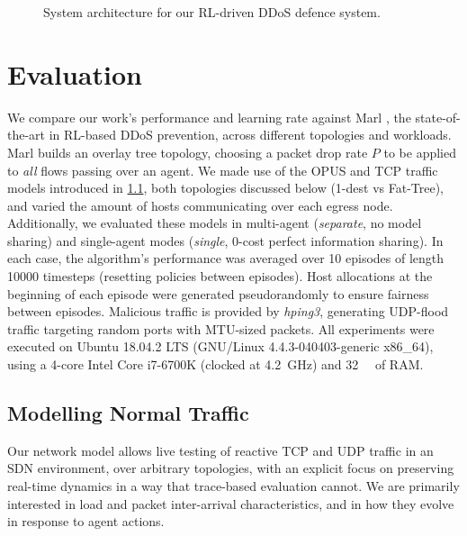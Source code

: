 \documentclass[10pt, times, conference, letterpaper]{IEEEtran}
\begin{document}
\begin{figure}
{}
	\caption{
		System architecture  for our RL-driven DDoS defence system.
		\label{fig:sys-arch}
	}
\vspace{-1em}
\end{figure}

\section{Evaluation}
We compare our work's performance and learning rate against Marl \cite{DBLP:journals/eaai/MalialisK15}, the state-of-the-art in RL-based DDoS prevention, across different topologies and workloads.
Marl builds an overlay tree topology, choosing a packet drop rate $P$ to be applied to \emph{all} flows passing over an agent.
We made use of the OPUS and TCP traffic models introduced in \cref{sec:a-new-normal}, both topologies discussed below (1-dest vs Fat-Tree), and varied the amount of hosts communicating over each egress node.
Additionally, we evaluated these models in multi-agent (\emph{separate}, no model sharing) and single-agent modes (\emph{single}, 0-cost perfect information sharing).
In each case, the algorithm's performance was averaged over \num{10} episodes of length \num{10000} timesteps (resetting policies between episodes).
Host allocations at the beginning of each episode were generated pseudorandomly to ensure fairness between episodes.
Malicious traffic is provided by \emph{hping3}, generating UDP-flood traffic targeting random ports with MTU-sized packets.
All experiments were executed on Ubuntu 18.04.2 LTS (GNU/Linux 4.4.3-040403-generic x86\_64), using a 4-core Intel Core i7-6700K (clocked at \SI{4.2}{\giga\hertz}) and \SI{32}{\gibi\byte} of RAM.

\subsection{Modelling Normal Traffic}\label{sec:a-new-normal}
Our network model allows live testing of reactive TCP and UDP traffic in an SDN environment, over arbitrary topologies, with an explicit focus on preserving real-time dynamics in a way that trace-based evaluation cannot.
We are primarily interested in load and packet inter-arrival characteristics, and in how they evolve in response to agent actions.
\end{document}
